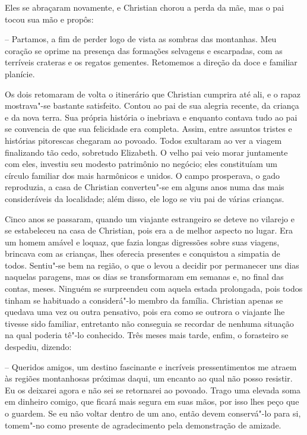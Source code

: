 Eles se abraçaram novamente, e Christian chorou a perda da mãe, mas o
pai tocou sua mão e propôs:

-- Partamos, a fim de perder logo de vista as sombras das montanhas.
Meu coração se oprime na presença das formações selvagens e escarpadas,
com as terríveis crateras e os regatos gementes. Retomemos a direção da
doce e familiar planície.

Os dois retomaram de volta o itinerário que Christian cumprira até ali,
e o rapaz mostrava"-se bastante satisfeito. Contou ao pai de sua alegria
recente, da criança e da nova terra. Sua própria história o inebriava e
enquanto contava tudo ao pai se convencia de que sua felicidade era
\mbox{completa}. Assim, entre assuntos tristes e histórias pitorescas chegaram
ao povoado. Todos exultaram ao ver a viagem finalizando tão cedo,
sobretudo Elizabeth. O velho pai veio morar juntamente com eles,
investiu seu modesto patrimônio no negócio; eles constituíam um círculo
familiar dos mais harmônicos e unidos. O campo prosperava, o gado
reproduzia, a casa de Christian converteu"-se em alguns anos numa das
mais consideráveis da localidade; além disso, ele logo se viu pai de
várias crianças.

Cinco anos se passaram, quando um viajante estrangeiro se deteve no
vilarejo e se estabeleceu na casa de Christian, pois era a de melhor
aspecto no lugar. Era um homem amável e loquaz, que fazia longas
digressões sobre suas viagens, brincava com as crianças, lhes oferecia
presentes e conquistou a simpatia de todos. Sentiu"-se bem na região, o
que o levou a decidir por permanecer uns dias naquelas paragens, mas os
dias se transformaram em semanas e, no final das contas, \mbox{meses}. Ninguém
se surpreendeu com aquela estada prolongada, pois todos tinham se
habituado a considerá"-lo membro da família. Christian apenas se quedava
uma vez ou outra pensativo, pois era como se outrora o viajante lhe
tivesse sido familiar, entretanto não conseguia se recordar de nenhuma
situação na qual poderia tê"-lo conhecido. Três meses mais tarde, enfim,
o forasteiro se despediu, dizendo:

-- Queridos amigos, um destino fascinante e incríveis pressentimentos
me atraem às regiões montanhosas próximas daqui, um encanto ao qual não
posso resistir. Eu os deixarei agora e não sei se retornarei ao
povoado. Trago uma elevada soma em dinheiro comigo, que ficará mais
segura em suas mãos, por isso lhes peço que o guardem. Se eu não voltar
dentro de um ano, então devem conservá"-lo para si, tomem"-no como
presente de agradecimento pela demonstração de amizade.

